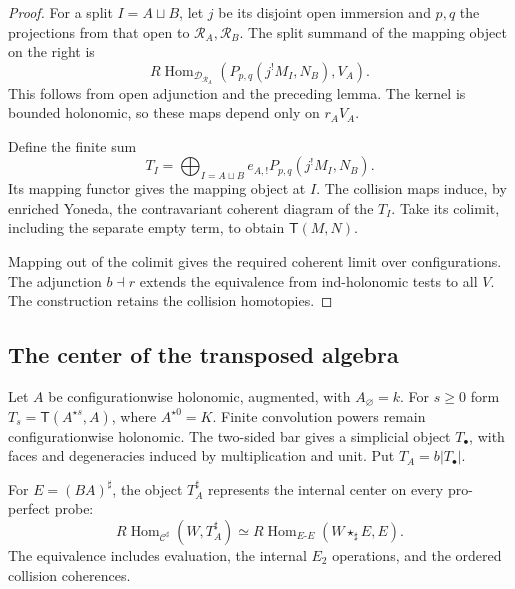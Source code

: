 \begin{proof}
For a split $I=A\sqcup B$, let $j$
be its disjoint open immersion and
$p,q$ the projections from that
open to $\mathscr R_A,\mathscr R_B$.
The split summand of the mapping
object on the right is
\[
 R\operatorname{Hom}_{\mathcal D_{\mathscr R_A}}
       (P_{p,q}(j^!M_I,N_B),V_A).
\]
This follows from open adjunction
and the preceding lemma.
The kernel is bounded holonomic,
so these maps depend only on
$r_AV_A$.

Define the finite sum
\[
 T_I=\bigoplus_{I=A\sqcup B}
       e_{A,!}P_{p,q}(j^!M_I,N_B).
\]
Its mapping functor gives the
mapping object at $I$.
The collision maps induce, by
enriched Yoneda, the contravariant
coherent diagram of the $T_I$.
Take its colimit, including the
separate empty term, to obtain
$\mathsf T(M,N)$.

Mapping out of the colimit gives
the required coherent limit over
configurations. The adjunction
$b\dashv r$ extends the equivalence
from ind-holonomic tests to all
$V$. The construction retains the
collision homotopies.
\end{proof}

\subsection{The center of the transposed algebra}
\label{v4-arith:centers:subsec:holonomic-center}

Let $A$ be configurationwise holonomic,
augmented, with $A_\varnothing=k$.
For $s\geq0$ form
$T_s=\mathsf T(A^{\star s},A)$,
where $A^{\star0}=K$.
Finite convolution powers remain
configurationwise holonomic.
The two-sided bar gives a simplicial
object $T_\bullet$, with faces and
degeneracies induced by multiplication
and unit. Put $T_A=b|T_\bullet|$.

\begin{theorem}\label{v4-arith:centers:thm:holonomic-center}
For $E=(BA)^\sharp$, the object
$T_A^\sharp$ represents the internal
center on every pro-perfect probe:
\[
 R\operatorname{Hom}_{\mathcal C^\sharp}
       (W,T_A^\sharp)
 \simeq
 R\operatorname{Hom}_{E\text{-}E}
       (W\star_\sharp E,E).
\]
The equivalence includes evaluation,
the internal $E_2$ operations, and
the ordered collision coherences.
\end{theorem}

